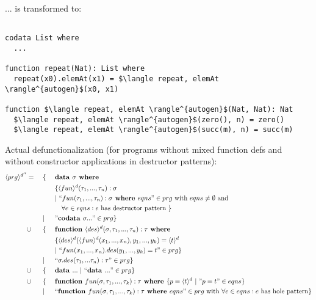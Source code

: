 \documentclass[11pt]{article} %
\begin{document}
... is transformed to:

\begin{lstlisting}[mathescape]

codata List where
  ...

function repeat(Nat): List where
  repeat(x0).elemAt(x1) = $\langle repeat, elemAt \rangle^{autogen}$(x0, x1)

function $\langle repeat, elemAt \rangle^{autogen}$(Nat, Nat): Nat
  $\langle repeat, elemAt \rangle^{autogen}$(zero(), n) = zero()
  $\langle repeat, elemAt \rangle^{autogen}$(succ(m), n) = succ(m)

\end{lstlisting}

Actual defunctionalization (for programs without mixed function defs and without constructor applications in destructor patterns):
\begin{alignat*}{3}
\langle prg \rangle^{d''} & = ~&& \{ ~&& \textrm{\textbf{data }} \sigma \textrm{\textbf{ where }} \\
& && && \{ \langle fun \rangle^d (\tau_1, ..., \tau_n): \sigma \\
& && && | ~ `` fun (\tau_1, ..., \tau_n): \sigma \textrm{\textbf{ where }} eqns " \in prg \textrm{ with } eqns \neq \emptyset \textrm{ and } \\
& && &&\quad \forall e \in eqns: e \textrm{ has destructor pattern }  \} \\
& && | && "\textrm{\textbf{codata }} \sigma ..." \in prg \} \\
& \cup && \{ && \textrm{\textbf{function }} \langle des \rangle^d (\sigma, \tau_1, ..., \tau_n): \tau \textrm{\textbf{ where }} \\
& && && \{ \langle des \rangle^d ( \langle fun \rangle^d (x_1, ..., x_n), y_1, ..., y_k) = \langle t \rangle^d \\
& && && | ~ `` fun(x_1, ..., x_n).des(y_1, ..., y_k) = t " \in prg \} \\
& && | && `` \sigma.des(\tau_1, ... \tau_n): \tau " \in prg \} \\
& \cup && \{ && \textrm{\textbf{data }} ... ~ | ~ `` \textrm{\textbf{data }} ... " \in prg \} \\
& \cup && \{ && \textrm{\textbf{function }} fun(\sigma, \tau_1, ..., \tau_k): \tau \textrm{\textbf{ where }} \{ p = \langle t \rangle^d ~ | ~ "p = t" \in eqns \} \\
& && | && `` \textrm{\textbf{function }} fun(\sigma, \tau_1, ..., \tau_k): \tau \textrm{\textbf{ where }} eqns " \in prg \textrm{ with } \forall e \in eqns: e \textrm{ has hole pattern}\} 
\end{alignat*}
\end{document}
